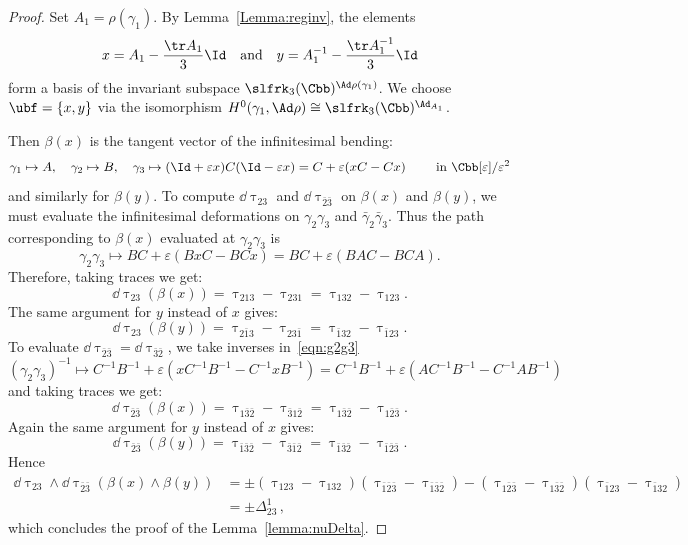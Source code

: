 \begin{proof}
Set $A_1 = \rho(\gamma_1)$. By Lemma~\ref{Lemma:reginv}, the elements
\[
x=A_1-\frac{\tr A_1 }{3}\Id\quad \text{and}\quad y=A_1^{-1}-\frac{\tr A_1^{-1}}{3}\Id
\]
form a basis of the invariant subspace $\slfrk_3(\Cbb)^{\Ad\rho(\gamma_1)}$. We choose $\ubf=\{x,y\}$ via the isomorphism $H^0(\gamma_1,\Ad\rho)\cong \slfrk_3(\Cbb)^{{\Ad}_{A_1}}$.



Then $\beta(x)$ is the tangent vector of the infinitesimal bending:
\[
\gamma_1\mapsto A, \quad \gamma_2\mapsto B, \quad \gamma_3\mapsto (\Id+\varepsilon x)C(\Id-\varepsilon x)= C+\varepsilon(xC-Cx)
\qquad \text{ in }\Cbb[\varepsilon]/\varepsilon^2
\]
and similarly for $\beta(y)$. To compute $\dd\uptau_{23}$ and $\dd\uptau_{\bar 2\bar 3}$ on $\beta(x)$ and $\beta(y)$, we must evaluate the infinitesimal deformations on $\gamma_2\gamma_3$ and $\bar\gamma_2\bar\gamma_3$. Thus the path corresponding to $\beta(x)$ evaluated at $\gamma_2\gamma_3$ is
\begin{equation}\label{eqn:g2g3}
\gamma_2\gamma_3\mapsto BC+\varepsilon(BxC-BCx)= BC+\varepsilon(BAC-BCA).
\end{equation}
Therefore, taking traces we get:
\begin{equation}\label{eqn:dt23x}
\dd\uptau_{23}(\beta(x))=\uptau_{213}-\uptau_{231}=\uptau_{132}-\uptau_{123}.
\end{equation}
The same argument for $y$ instead of $x$ gives:
\begin{equation}\label{eqn:dt23y}
\dd\uptau_{23}(\beta(y))=\uptau_{2\bar 13}-\uptau_{23\bar 1}=\uptau_{\bar 132}-\uptau_{\bar 123}.
\end{equation}
To evaluate $\dd\uptau_{\bar 2\bar 3}=\dd\uptau_{\bar 3\bar 2}$, we take inverses in~\eqref{eqn:g2g3}
\begin{equation}\label{eqn:barg3g3}
(\gamma_2\gamma_3)^{-1}\mapsto C^{-1}B^{-1}+\varepsilon(xC^{-1}B^{-1}-C^{-1}xB^{-1})= C^{-1}B^{-1}+\varepsilon(AC^{-1}B^{-1}-C^{-1}AB^{-1})
\end{equation}
and taking traces we get:
\begin{equation}\label{eqn:dtbar23x}
\dd\uptau_{\bar 2\bar 3}(\beta(x))=\uptau_{1\bar 3\bar 2}-\uptau_{\bar 31\bar 2}=\uptau_{1\bar 3\bar 2}-\uptau_{1\bar 2\bar 3}.
\end{equation}
Again the same argument for $y$ instead of $x$ gives:
\begin{equation}\label{eqn:dtbar23y}
\dd\uptau_{\bar 2\bar 3}(\beta(y))=\uptau_{\bar 1\bar 3\bar 2}-\uptau_{\bar 3\bar 1\bar 2}=\uptau_{\bar 1\bar 3\bar 2}-\uptau_{\bar 1\bar 2\bar 3}.
\end{equation}
Hence
\begin{align*}
\dd\uptau_{23}\wedge \dd\uptau_{\bar 2\bar 3}(\beta(x)\wedge\beta(y)) &=\pm (\uptau_{123}-\uptau_{132}) (\uptau_{\bar 1\bar 2\bar 3}-\uptau_{\bar 1\bar 3\bar 2}) - (\uptau_{1\bar 2\bar 3}-\uptau_{1\bar 3\bar 2}) (\uptau_{\bar 1 2 3}-\uptau_{\bar 1 3 2 }) \\
&=\pm
\varDelta^1_{23}\,,
\end{align*}
which concludes the proof of the Lemma~\ref{lemma:nuDelta}.
\end{proof}


